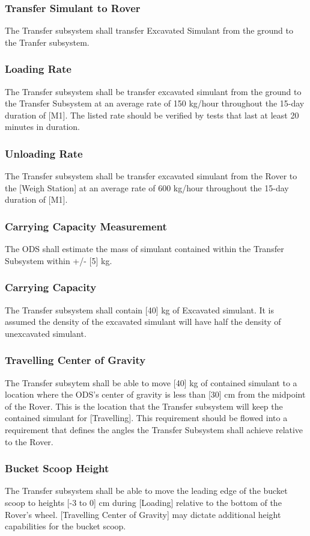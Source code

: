 \subsubsection{Transfer Simulant to Rover}
The Transfer subsystem shall transfer Excavated Simulant from the ground to the Tranfer subsystem.  
\subsubsection{Loading Rate}
The Transfer subsystem shall be transfer excavated simulant from the ground to the Transfer Subsystem at an average rate of 150 kg/hour throughout the 15-day duration of [M1]. The listed rate should be verified by tests that last at least 20 minutes in duration.  
\subsubsection{Unloading Rate}
The Transfer subsystem shall be transfer excavated simulant from the Rover to the [Weigh Station] at an average rate of 600 kg/hour throughout the 15-day duration of [M1]. 
\subsubsection{Carrying Capacity Measurement}
The ODS shall estimate the mass of simulant contained within the Transfer Subsystem within +/- [5] kg.
\subsubsection{Carrying Capacity}
The Transfer subsystem shall contain [40] kg of Excavated simulant. It is assumed the density of the excavated simulant will have half the density of unexcavated simulant. 
\subsubsection{Travelling Center of Gravity}
The Transfer subsytem shall be able to move [40] kg of contained simulant to a location where the ODS's center of gravity is less than [30] cm from the midpoint of the Rover. This is the location that the Transfer subsystem will keep the contained simulant for [Travelling]. This requirement should be flowed into a requirement that defines the angles the Transfer Subsystem shall achieve relative to the Rover.
\subsubsection{Bucket Scoop Height}
The Transfer subsystem shall be able to move the leading edge of the bucket scoop to heights [-3 to 0] cm during [Loading] relative to the bottom of the Rover's wheel. [Travelling Center of Gravity] may dictate additional height capabilities for the bucket scoop. 
